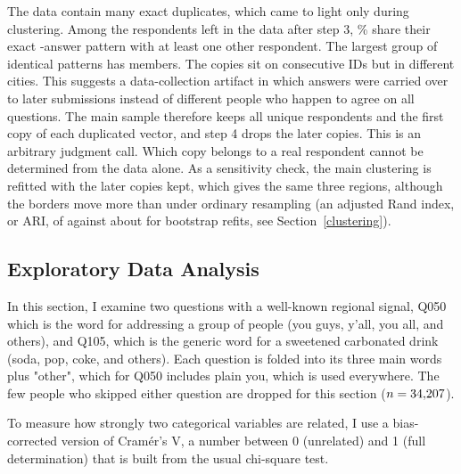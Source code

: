\documentclass[10pt,letterpaper]{article}
\begin{document}
The data contain many exact duplicates, which came to light only during clustering. Among the respondents left in the data after step 3, \stPctInDupGroup\% share their exact \nQuestions-answer pattern with at least one other respondent. The largest group of identical patterns has \stBiggestDupGroup{} members. The copies sit on consecutive IDs but in different cities. This suggests a data-collection artifact in which answers were carried over to later submissions instead of different people who happen to agree on all questions. The main sample therefore keeps all unique respondents and the first copy of each duplicated vector, and step 4 drops the later copies. This is an arbitrary judgment call. Which copy belongs to a real respondent cannot be determined from the data alone. As a sensitivity check, the main clustering is refitted with the \stNDupRows{} later copies kept, which gives the same three regions, although the borders move more than under ordinary resampling (an adjusted Rand index, or ARI, of \stDedupARI{} against about \stBootARIMedian{} for bootstrap refits, see Section~\ref{clustering}).

\subsection{Exploratory Data Analysis}\label{data-exploration}

In this section, I examine two questions with a well-known regional signal, Q050 which is the word for addressing a group of people (you guys, y'all, you all, and others), and Q105, which is the generic word for a sweetened carbonated drink (soda, pop, coke, and others). Each question is folded into its three main words plus "other", which for Q050 includes plain you, which is used everywhere. The few people who skipped either question are dropped for this section ($n=34{,}207$).

To measure how strongly two categorical variables are related, I use a bias-corrected version of Cram\'er's V, a number between 0 (unrelated) and 1 (full determination) that is built from the usual chi-square test.
\end{document}

